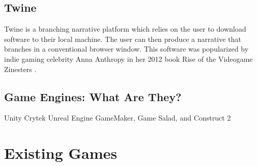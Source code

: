 \subsection{Twine}
Twine is a branching narrative platform which relies on the user to download software to their local machine. The user can then produce a narrative that branches in a conventional browser window. This software was popularized by indie gaming celebrity Anna Anthropy in her 2012 book Rise of the Videogame Zinesters \cite{anthropy}. 


\subsection{Game Engines: What Are They?}
Unity
Crytek
Unreal Engine
GameMaker, Game Salad, and Construct 2



\section{Existing Games}